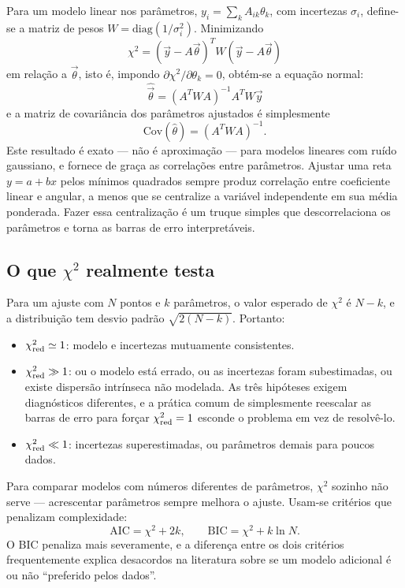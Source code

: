 \documentclass[11pt,a4paper]{article}
\begin{document}
Para um modelo linear nos parâmetros, $y_i=\sum_k A_{ik}\theta_k$, com incertezas $\sigma_i$, define-se a matriz de pesos $W=\mathrm{diag}(1/\sigma_i^{2})$. Minimizando
\[
\chi^{2}=(\vec{y}-A\vec{\theta})^{T}W(\vec{y}-A\vec{\theta})
\]
em relação a $\vec{\theta}$, isto é, impondo $\partial\chi^{2}/\partial\theta_k=0$, obtém-se a equação normal:
\[
\boxed{\ \hat{\vec{\theta}}=\left(A^{T}WA\right)^{-1}A^{T}W\vec{y}\ }
\]
e a matriz de covariância dos parâmetros ajustados é simplesmente
\[
\mathrm{Cov}(\hat{\theta})=\left(A^{T}WA\right)^{-1}.
\]
Este resultado é exato --- não é aproximação --- para modelos lineares com ruído gaussiano, e fornece de graça as correlações entre parâmetros. Ajustar uma reta $y=a+bx$ pelos mínimos quadrados sempre produz correlação entre coeficiente linear e angular, a menos que se centralize a variável independente em sua média ponderada. Fazer essa centralização é um truque simples que descorrelaciona os parâmetros e torna as barras de erro interpretáveis.

\subsection*{O que $\chi^2$ realmente testa}

Para um ajuste com $N$ pontos e $k$ parâmetros, o valor esperado de $\chi^{2}$ é $N-k$, e a distribuição tem desvio padrão $\sqrt{2(N-k)}$. Portanto:
\begin{itemize}
\item $\chi^{2}_{\rm red}\simeq1$: modelo e incertezas mutuamente consistentes.
\item $\chi^{2}_{\rm red}\gg1$: ou o modelo está errado, ou as incertezas foram subestimadas, ou existe dispersão intrínseca não modelada. As três hipóteses exigem diagnósticos diferentes, e a prática comum de simplesmente reescalar as barras de erro para forçar $\chi^{2}_{\rm red}=1$ esconde o problema em vez de resolvê-lo.
\item $\chi^{2}_{\rm red}\ll1$: incertezas superestimadas, ou parâmetros demais para poucos dados.
\end{itemize}

Para comparar modelos com números diferentes de parâmetros, $\chi^{2}$ sozinho não serve --- acrescentar parâmetros sempre melhora o ajuste. Usam-se critérios que penalizam complexidade:
\[
\mathrm{AIC}=\chi^{2}+2k,
\qquad
\mathrm{BIC}=\chi^{2}+k\ln N.
\]
O BIC penaliza mais severamente, e a diferença entre os dois critérios frequentemente explica desacordos na literatura sobre se um modelo adicional é ou não ``preferido pelos dados''.
\end{document}
